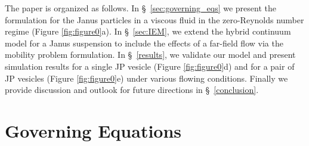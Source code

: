 \documentclass[lineno]{jfm}
\begin{document}
The paper is organized as follows. In \S~\ref{sec:governing_eqs} we
present the formulation for the Janus particles in a viscous fluid in
the zero-Reynolds number regime (Figure \ref{fig:figure0}a). In
\S~\ref{sec:IEM}, we extend the hybrid continuum model for a Janus
suspension to include the effects of a far-field flow via the mobility
problem formulation. In \S~\ref{results}, we validate our model and
present simulation results for a single JP vesicle (Figure
\ref{fig:figure0}d) and for a pair of JP vesicles (Figure
\ref{fig:figure0}e) under various flowing conditions. Finally we provide
discussion and outlook for future directions in \S~\ref{conclusion}.



\section{Governing Equations\label{sec:governing_eqs}}
\end{document}
